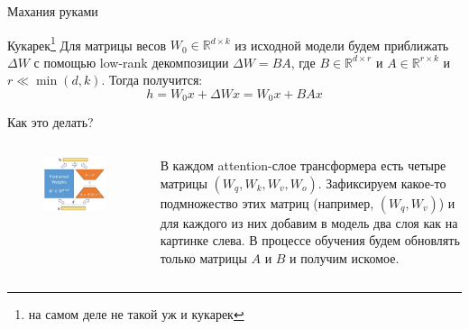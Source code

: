 \documentclass[9pt]{beamer}
\begin{document}
\begin{frame}{Махания руками}

    \begin{block}{Кукарек\footnote{на самом деле не такой уж и кукарек}}
        Для матрицы весов $W_0 \in \mathbb{R}^{d \times k}$ из исходной модели будем приближать $\Delta W$ с помощью low-rank декомпозиции $\Delta W = B A$, где $B \in \mathbb{R}^{d \times r}$ и $A \in \mathbb{R}^{r \times k}$ и $r \ll \min(d, k)$. Тогда получится: \[ h = W_0 x + \Delta W x = W_0 x + B A x \]
    \end{block}

    \begin{block}{Как это делать?}
        \begin{columns}
             \begin{figure}
                \begin{center}
                    \includegraphics[scale=0.4]{images/lora_2.jpg}
                \end{center}
            \end{figure}
             В каждом attention-слое трансформера есть четыре матрицы $(W_q, W_k, W_v, W_o)$. Зафиксируем какое-то подмножество этих матриц (например, $(W_q, W_v)$) и для каждого из них добавим в модель два слоя как на картинке слева. В процессе обучения будем обновлять только матрицы $A$ и $B$ и получим искомое.
        \end{columns}
    \end{block}

\end{frame}
\end{document}
